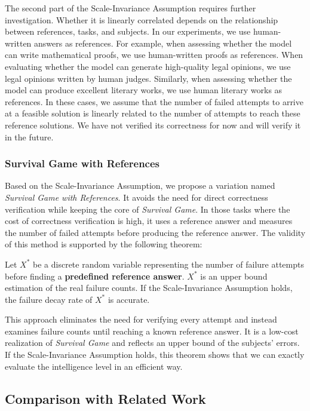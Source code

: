 The second part of the Scale-Invariance Assumption requires further investigation. 
Whether it is linearly correlated depends on the relationship between references, tasks, and subjects.
In our experiments, we use human-written answers as references. For example, when assessing whether the model can write mathematical proofs, we use human-written proofs as references. When evaluating whether the model can generate high-quality legal opinions, we use legal opinions written by human judges. Similarly, when assessing whether the model can produce excellent literary works, we use human literary works as references.
In these cases, we assume that the number of failed attempts to arrive at a feasible solution is linearly related to the number of attempts to reach these reference solutions. 
We have not verified its correctness for now and will verify it in the future.

\subsubsection{Survival Game with References}

Based on the Scale-Invariance Assumption, we propose a variation named \textit{Survival Game with References}. It avoids the need for direct correctness verification while keeping the core of \textit{Survival Game}. In those tasks where the cost of correctness verification is high, it uses a reference answer and measures the number of failed attempts before producing the reference answer. The validity of this method is supported by the following theorem:
\begin{thm}
Let \( X^* \) be a discrete random variable representing the number of failure attempts before finding a \textbf{predefined reference answer}.  
\( X^* \) is an upper bound estimation of the real failure counts.
If the Scale-Invariance Assumption holds, the failure decay rate of \( X^* \) is accurate.
\end{thm}

This approach eliminates the need for verifying every attempt and instead examines failure counts until reaching a known reference answer. It is a low-cost realization of \textit{Survival Game} and reflects an upper bound of the subjects' errors.
If the Scale-Invariance Assumption holds, this theorem shows that we can exactly evaluate the intelligence level in an efficient way. 



\subsection{Comparison with Related Work}
\label{sec:comparison_with_related_work}

